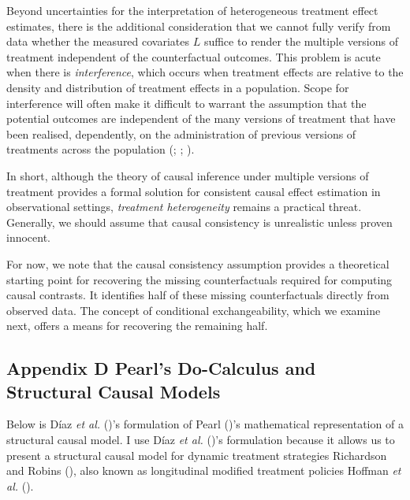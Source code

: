 \documentclass[
  single column]{article}
\begin{document}
Beyond uncertainties for the interpretation of heterogeneous treatment
effect estimates, there is the additional consideration that we cannot
fully verify from data whether the measured covariates \(L\) suffice to
render the multiple versions of treatment independent of the
counterfactual outcomes. This problem is acute when there is
\emph{interference}, which occurs when treatment effects are relative to
the density and distribution of treatment effects in a population. Scope
for interference will often make it difficult to warrant the assumption
that the potential outcomes are independent of the many versions of
treatment that have been realised, dependently, on the administration of
previous versions of treatments across the population
(;
;
).

In short, although the theory of causal inference under multiple
versions of treatment provides a formal solution for consistent causal
effect estimation in observational settings, \emph{treatment
heterogeneity} remains a practical threat. Generally, we should assume
that causal consistency is unrealistic unless proven innocent.

For now, we note that the causal consistency assumption provides a
theoretical starting point for recovering the missing counterfactuals
required for computing causal contrasts. It identifies half of these
missing counterfactuals directly from observed data. The concept of
conditional exchangeability, which we examine next, offers a means for
recovering the remaining half.

\newpage{}

\subsection{Appendix D Pearl's Do-Calculus and Structural Causal
Models}\label{id-app-d}

Below is Díaz \emph{et al.} ()'s
formulation of Pearl ()'s mathematical
representation of a structural causal model. I use Díaz \emph{et al.}
()'s formulation because it allows us to
present a structural causal model for dynamic treatment strategies
Richardson and Robins (), also known
as longitudinal modified treatment policies Hoffman \emph{et al.}
().
\end{document}

